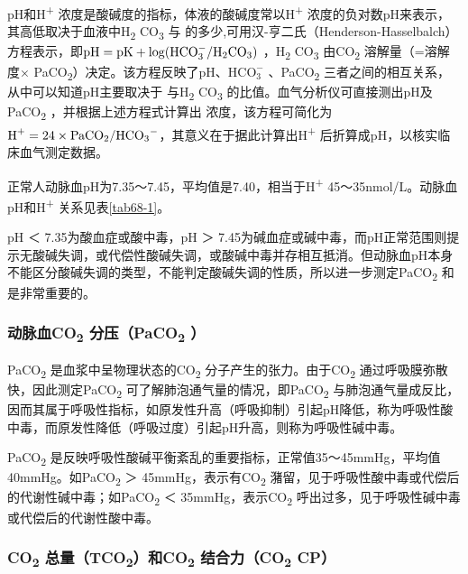 pH和H\textsuperscript{+}
浓度是酸碱度的指标，体液的酸碱度常以H\textsuperscript{+}
浓度的负对数pH来表示，其高低取决于血液中H\textsubscript{2}
CO\textsubscript{3} 与{}
的多少,可用汉-亨二氏（Henderson-Hasselbalch）方程表示，即$\text{pH}=\text{pK}+\log(\text{HCO}_3^-/\ce{H2CO3})$
，H\textsubscript{2} CO\textsubscript{3} 由CO\textsubscript{2}
溶解量（=溶解度× PaCO\textsubscript{2}）决定。该方程反映了pH、$\text{HCO}_3^-$ 、PaCO\textsubscript{2}
三者之间的相互关系，从中可以知道pH主要取决于 与H\textsubscript{2}
CO\textsubscript{3}
的比值。血气分析仪可直接测出pH及PaCO\textsubscript{2}
，并根据上述方程式计算出{}
浓度，该方程可简化为$\ce{H+}=24\times\text{Pa}\ce{CO2}/\ce{HCO3-}$，其意义在于据此计算出H\textsuperscript{+}
后折算成pH，以核实临床血气测定数据。

正常人动脉血pH为7.35～7.45，平均值是7.40，相当于H\textsuperscript{+}
45～35nmol/L。动脉血pH和H\textsuperscript{+} 关系见表\ref{tab68-1}。

pH ＜ 7.35为酸血症或酸中毒，pH ＞
7.45为碱血症或碱中毒，而pH正常范围则提示无酸碱失调，或代偿性酸碱失调，或酸碱中毒并存相互抵消。但动脉血pH本身不能区分酸碱失调的类型，不能判定酸碱失调的性质，所以进一步测定PaCO\textsubscript{2}
和{} 是非常重要的。

\subsubsection{动脉血CO\textsubscript{2} 分压（PaCO\textsubscript{2} ）}

PaCO\textsubscript{2} 是血浆中呈物理状态的CO\textsubscript{2}
分子产生的张力。由于CO\textsubscript{2}
通过呼吸膜弥散快，因此测定PaCO\textsubscript{2}
可了解肺泡通气量的情况，即PaCO\textsubscript{2}
与肺泡通气量成反比，因而其属于呼吸性指标，如原发性升高（呼吸抑制）引起pH降低，称为呼吸性酸中毒，而原发性降低（呼吸过度）引起pH升高，则称为呼吸性碱中毒。

PaCO\textsubscript{2}
是反映呼吸性酸碱平衡紊乱的重要指标，正常值35～45mmHg，平均值40mmHg。如PaCO\textsubscript{2}
＞ 45mmHg，表示有CO\textsubscript{2}
潴留，见于呼吸性酸中毒或代偿后的代谢性碱中毒；如PaCO\textsubscript{2} ＜
35mmHg，表示CO\textsubscript{2}
呼出过多，见于呼吸性碱中毒或代偿后的代谢性酸中毒。

\subsubsection{CO\textsubscript{2} 总量（TCO\textsubscript{2}）和CO\textsubscript{2} 结合力（CO\textsubscript{2} CP）}

